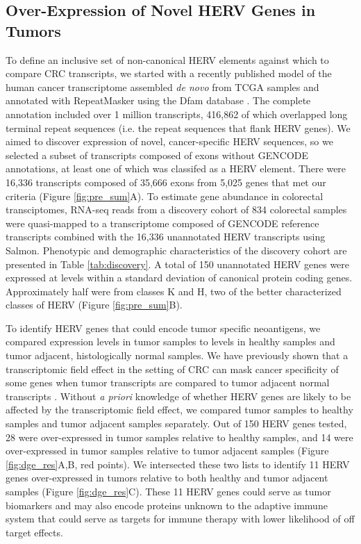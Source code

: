 \subsection*{Over-Expression of Novel HERV Genes in Tumors}
To define an inclusive set of non-canonical HERV elements against which to compare CRC transcripts, we started with a recently published model of the human cancer transcriptome assembled \emph{de novo} from TCGA samples and annotated with RepeatMasker using the Dfam database \citep{Attig2019}.
The complete annotation included over 1 million transcripts, 416,862 of which overlapped long terminal repeat sequences (i.e. the repeat sequences that flank HERV genes).
We aimed to discover expression of novel, cancer-specific HERV sequences, so we selected a subset of transcripts composed of exons without GENCODE annotations, at least one of which was classifed as a HERV element.
There were 16,336 transcripts composed of 35,666 exons from 5,025 genes that met our criteria (Figure \ref{fig:pre_sum}A).
To estimate gene abundance in colorectal transciptomes, RNA-seq reads from a discovery cohort of 834 colorectal samples were quasi-mapped to a transcriptome composed of GENCODE reference transcripts combined with the 16,336 unannotated HERV transcripts using Salmon.
Phenotypic and demographic characteristics of the discovery cohort are presented in Table \ref{tab:discovery}.
A total of 150 unannotated HERV genes were expressed at levels within a standard deviation of canonical protein coding genes.
Approximately half were from classes K and H, two of the better characterized classes of HERV (Figure \ref{fig:pre_sum}B).

To identify HERV genes that could encode tumor specific neoantigens, we compared expression levels in tumor samples to levels in healthy samples and tumor adjacent, histologically normal samples.
We have previously shown that a transcriptomic field effect in the setting of CRC can mask cancer specificity of some genes when tumor transcripts are compared to tumor adjacent normal transcripts \citep{Dampier2020}.
Without \emph{a priori} knowledge of whether HERV genes are likely to be affected by the transcriptomic field effect, we compared tumor samples to healthy samples and tumor adjacent samples separately.
Out of 150 HERV genes tested, 28 were over-expressed in tumor samples relative to healthy samples, and 14 were over-expressed in tumor samples relative to tumor adjacent samples (Figure \ref{fig:dge_res}A,B, red points).
We intersected these two lists to identify 11 HERV genes over-expressed in tumors relative to both healthy and tumor adjacent samples (Figure \ref{fig:dge_res}C).
These 11 HERV genes could serve as tumor biomarkers and may also encode proteins unknown to the adaptive immune system that could serve as targets for immune therapy with lower likelihood of off target effects.

